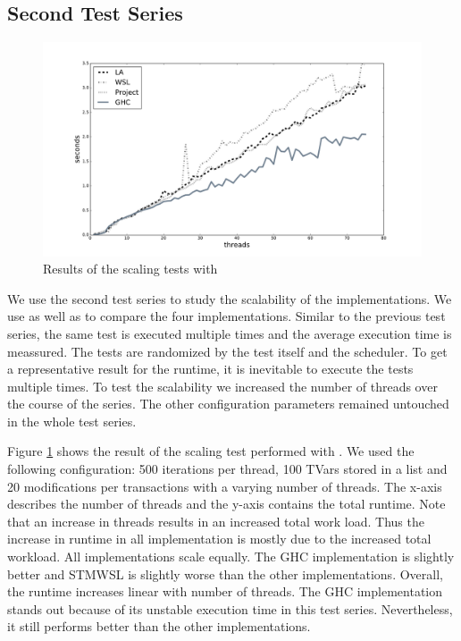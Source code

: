 \subsection{Second Test Series}
\begin{figure}
 \centering
 \includegraphics[scale=0.35]{Figures/Scaling1}
\caption[Runtime: Scaling Test I]{Results of the scaling tests with }
\label{fig:scaling1}
\end{figure}

We use the second test series to study the scalability of the implementations. We use  as well as
 to compare the four implementations. Similar to the previous test series, the same test
is executed multiple times and the average execution time is meassured. The tests are randomized by the test itself 
and the scheduler. To get a representative result for the runtime, it is inevitable to execute the tests multiple 
times. To test the scalability we increased the number of threads over the course of the series. The other 
configuration parameters remained untouched in the whole test series. 


Figure \ref{fig:scaling1} shows the result of the scaling test performed with . We used the following 
configuration: 500 iterations per thread, 100 TVars stored in a list and 20 modifications per transactions with 
a varying number of threads. The x-axis describes the number of threads and the y-axis contains the total runtime.
Note that an increase in threads results in an increased total work load. Thus the increase in runtime in all implementation
is mostly due to the increased total workload.
All implementations scale equally. The GHC implementation is slightly better and STMWSL is slightly worse than the other 
implementations. Overall, the runtime increases linear with number of threads. The GHC implementation stands out because of
its unstable execution time in this test series. Nevertheless, it still performs better than the other implementations.

